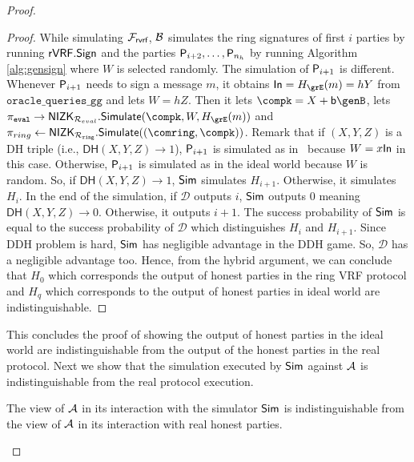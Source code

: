 \begin{proof}
\begin{proof}
			
			While simulating $ \mathcal{F}_{\textsf{rvrf}} $, $\mathcal{B} $ simulates the ring signatures of first $ i $ parties by running $ {\mathsf{rVRF}}.{\mathsf{Sign}} $ and the parties $ \mathsf{P}_{i+2}, \ldots, \mathsf{P}_{n_h} $ by running Algorithm \ref{alg:gensign} where $ W $ is selected randomly. The simulation of $ \mathsf{P}_{i + 1} $ is different.  Whenever $ \mathsf{P}_{i+1} $ needs to sign a message $ m$, it obtains $ \In = \hashG(m) = hY $ from $ \mathtt{oracle\_queries\_gg} $ and lets $ W = hZ $. Then it lets $ \compk = X + \openpk\genB $, lets  $ \pieval \rightarrow \NIZK_{\rcom}.\Simulate(\compk,W,\hashG(m)) $ and  $ \pi_{ring} \leftarrow \NIZK_{\rsnark}.\Simulate((\comring, \compk)) $.  Remark that if $ (X,Y,Z)$ is a DH triple (i.e., $  \mathsf{DH}(X,Y,Z) \rightarrow 1 $), $ \mathsf{P}_{i+1} $ is simulated as in \name \ because $ W = x{\mathsf{In}}$ in this case. Otherwise, $ \mathsf{P}_{i+1} $ is simulated as in the ideal world because $ W $ is random. So, if $  \mathsf{DH}(X,Y,Z)  \rightarrow 1$, $\mathsf{Sim} $ simulates $ H_{i+1} $. Otherwise, it simulates $ H_{i} $. In the end of the simulation, if $ \mathcal{D} $ outputs $ i $, $\mathsf{Sim} $ outputs $ 0 $ meaning $  \mathsf{DH}(X,Y,Z) \rightarrow 0$. Otherwise, it outputs $ i + 1 $. The success probability of $\mathsf{Sim} $ is equal to the success probability of $\mathcal{D} $ which distinguishes $ H_i $ and $ H_{i +1} $. Since DDH problem is hard, $\mathsf{Sim} $ has negligible advantage in the DDH game. So, $ \mathcal{D} $ has a negligible advantage too. Hence, from the hybrid argument, we can conclude that $ H_0    $ which corresponds the output of honest parties in  the ring VRF protocol and $ H_q  $ which corresponds to  the output of honest parties in ideal world are indistinguishable.
			
			
		\end{proof}	
		This concludes the proof of showing the output of honest parties in the ideal world are indistinguishable from the output of the honest parties in the real protocol.
		Next we show that the simulation executed by $ \mathsf{Sim} $ against $ \mathcal{A} $ is indistinguishable from the real protocol execution.
		
		\begin{lemma} \label{lem:simulation-ind}
			The view of $ \mathcal{A} $ in its interaction with the simulator $ \mathsf{Sim} $ is indistinguishable from the view of $ \mathcal{A} $ in its interaction with real honest parties.
		\end{lemma}
		

\end{proof}

